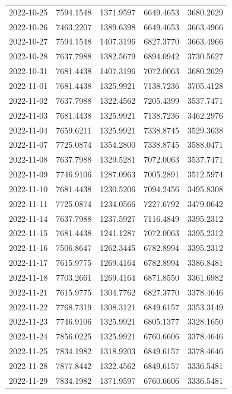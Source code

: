 \begin{footnotesize}
\begin{longtable}{lllll}
2022-10-25 & 7594.1548 & 1371.9597 & 6649.4653 & 3680.2629 \\
2022-10-26 & 7463.2207 & 1389.6398 & 6649.4653 & 3663.4966 \\
2022-10-27 & 7594.1548 & 1407.3196 & 6827.3770 & 3663.4966 \\
2022-10-28 & 7637.7988 & 1382.5679 & 6894.0942 & 3730.5627 \\
2022-10-31 & 7681.4438 & 1407.3196 & 7072.0063 & 3680.2629 \\
2022-11-01 & 7681.4438 & 1325.9921 & 7138.7236 & 3705.4128 \\
2022-11-02 & 7637.7988 & 1322.4562 & 7205.4399 & 3537.7471 \\
2022-11-03 & 7681.4438 & 1325.9921 & 7138.7236 & 3462.2976 \\
2022-11-04 & 7659.6211 & 1325.9921 & 7338.8745 & 3529.3638 \\
2022-11-07 & 7725.0874 & 1354.2800 & 7338.8745 & 3588.0471 \\
2022-11-08 & 7637.7988 & 1329.5281 & 7072.0063 & 3537.7471 \\
2022-11-09 & 7746.9106 & 1287.0963 & 7005.2891 & 3512.5974 \\
2022-11-10 & 7681.4438 & 1230.5206 & 7094.2456 & 3495.8308 \\
2022-11-11 & 7725.0874 & 1234.0566 & 7227.6792 & 3479.0642 \\
2022-11-14 & 7637.7988 & 1237.5927 & 7116.4849 & 3395.2312 \\
2022-11-15 & 7681.4438 & 1241.1287 & 7072.0063 & 3395.2312 \\
2022-11-16 & 7506.8647 & 1262.3445 & 6782.8994 & 3395.2312 \\
2022-11-17 & 7615.9775 & 1269.4164 & 6782.8994 & 3386.8481 \\
2022-11-18 & 7703.2661 & 1269.4164 & 6871.8550 & 3361.6982 \\
2022-11-21 & 7615.9775 & 1304.7762 & 6827.3770 & 3378.4646 \\
2022-11-22 & 7768.7319 & 1308.3121 & 6849.6157 & 3353.3149 \\
2022-11-23 & 7746.9106 & 1325.9921 & 6805.1377 & 3328.1650 \\
2022-11-24 & 7856.0225 & 1325.9921 & 6760.6606 & 3378.4646 \\
2022-11-25 & 7834.1982 & 1318.9203 & 6849.6157 & 3378.4646 \\
2022-11-28 & 7877.8442 & 1322.4562 & 6849.6157 & 3336.5481 \\
2022-11-29 & 7834.1982 & 1371.9597 & 6760.6606 & 3336.5481 \\

\end{longtable}
\end{footnotesize}
